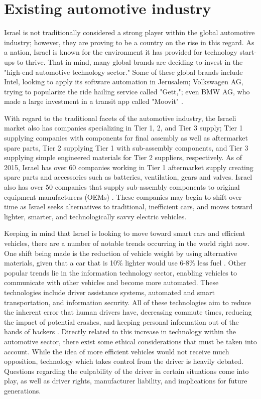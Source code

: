 \documentclass{report}                         %
\begin{document}
\section{Existing automotive industry}
Israel is not traditionally considered a strong player within the global automotive industry; however, they are proving to be a country on the rise in this regard. As a nation, Israel is known for the environment it has provided for technology start-ups to thrive. That in mind, many global brands are deciding to invest in the "high-end automotive technology sector." Some of these global brands include Intel, looking to apply its software automation in Jerusalem; Volkswagen AG, trying to popularize the ride hailing service called "Gett,"; even BMW AG, who made a large investment in a transit app called "Moovit" \cite{Coutinho2018IsraelIndustry}. 

With regard to the traditional facets of the automotive industry, the Israeli market also has companies specializing in Tier 1, 2, and Tier 3 supply; Tier 1 supplying companies with components for final assembly as well as aftermarket spare parts, Tier 2 supplying Tier 1 with sub-assembly components, and Tier 3 supplying simple engineered materials for Tier 2 suppliers, respectively. As of 2015, Israel has over 60 companies working in Tier 1 aftermarket supply creating spare parts and accessories such as batteries, ventilation, gears and valves. Israel also has over 50 companies that supply sub-assembly components to original equipment manufacturers (OEMs) \cite{MinistryofEconomyandIndustryStateofIsraelTheIsrael}. These companies may begin to shift over time as Israel seeks alternatives to traditional, inefficient cars, and moves toward lighter, smarter, and technologically savvy electric vehicles.

Keeping in mind that Israel is looking to move toward smart cars and efficient vehicles, there are a number of notable trends occurring in the world right now. One shift being made is the reduction of vehicle weight by using alternative materials, given that a car that is 10\% lighter would use 6-8\% less fuel \cite{MinistryofEconomyandIndustryStateofIsraelTheIsrael}. Other popular trends lie in the information technology sector, enabling vehicles to communicate with other vehicles and become more automated. These technologies include driver assistance systems, automated and smart transportation, and information security. All of these technologies aim to reduce the inherent error that human drivers have, decreasing commute times, reducing the impact of potential crashes, and keeping personal information out of the hands of hackers \cite{MinistryofEconomyandIndustryStateofIsraelTheIsrael}. Directly related to this increase in technology within the automotive sector, there exist some ethical considerations that must be taken into account. While the idea of more efficient vehicles would not receive much opposition, technology which takes control from the driver is heavily debated. Questions regarding the culpability of the driver in certain situations come into play, as well as driver rights, manufacturer liability, and implications for future generations.
\end{document}
